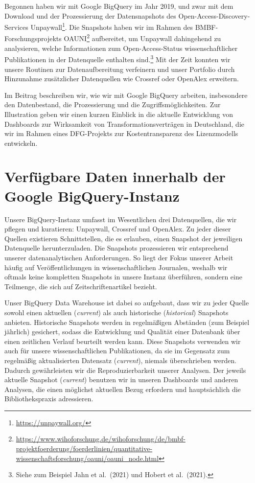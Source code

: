 \documentclass[a4paper,
fontsize=11pt,
oneside,
numbers=noperiodatend,
parskip=half-,
bibliography=totoc,
final
]{scrartcl}
\begin{document}
Begonnen haben wir mit Google BigQuery im Jahr 2019, und zwar mit dem
Download und der Prozessierung der Datensnapshots des
Open-Access-Discovery-Services Unpaywall\footnote{\url{https://unpaywall.org/}}.
Die Snapshots haben wir im Rahmen des BMBF-Forschungsprojekts
OAUNI\footnote{\url{https://www.wihoforschung.de/wihoforschung/de/bmbf-projektfoerderung/foerderlinien/quantitative-wissenschaftsforschung/oauni/oauni_node.html}}
aufbereitet, um Unpaywall dahingehend zu analysieren, welche
Informationen zum Open-Access-Status wissenschaftlicher Publikationen in
der Datenquelle enthalten sind.\footnote{Siehe zum Beispiel Jahn et
  al.~(2021) und Hobert et al.~(2021).} Mit der Zeit konnten wir unsere
Routinen zur Datenaufbereitung verfeinern und unser Portfolio durch
Hinzunahme zusätzlicher Datenquellen wie Crossref oder OpenAlex
erweitern.

Im Beitrag beschreiben wir, wie wir mit Google BigQuery arbeiten,
insbesondere den Datenbestand, die Prozessierung und die
Zugriffsmöglichkeiten. Zur Illustration geben wir einen kurzen Einblick
in die aktuelle Entwicklung von Dashboards zur Wirksamkeit von
Transformationsverträgen in Deutschland, die wir im Rahmen eines
DFG-Projekts zur Kostentransparenz des Lizenzmodells entwickeln.

\hypertarget{verfuxfcgbare-daten-innerhalb-der-google-bigquery-instanz}{%
\section{Verfügbare Daten innerhalb der Google
BigQuery-Instanz}\label{verfuxfcgbare-daten-innerhalb-der-google-bigquery-instanz}}

Unsere BigQuery-Instanz umfasst im Wesentlichen drei Datenquellen, die
wir pflegen und kuratieren: Unpaywall, Crossref und OpenAlex. Zu jeder
dieser Quellen existieren Schnittstellen, die es erlauben, einen
Snapshot der jeweiligen Datenquelle herunterzuladen. Die Snapshots
prozessieren wir entsprechend unserer datenanalytischen Anforderungen.
So liegt der Fokus unserer Arbeit häufig auf Veröffentlichungen in
wissenschaftlichen Journalen, weshalb wir oftmals keine kompletten
Snapshots in unsere Instanz überführen, sondern eine Teilmenge, die sich
auf Zeitschriftenartikel bezieht.

Unser BigQuery Data Warehouse ist dabei so aufgebaut, dass wir zu jeder
Quelle sowohl einen aktuellen (\emph{current}) als auch historische
(\emph{historical}) Snapshots anbieten. Historische Snapshots werden in
regelmäßigen Abständen (zum Beispiel jährlich) gesichert, sodass die
Entwicklung und Qualität einer Datenbank über einen zeitlichen Verlauf
beurteilt werden kann. Diese Snapshots verwenden wir auch für unsere
wissenschaftlichen Publikationen, da sie im Gegensatz zum regelmäßig
aktualisierten Datensatz (\emph{current}), niemals überschrieben werden.
Dadurch gewährleisten wir die Reproduzierbarkeit unserer Analysen. Der
jeweils aktuelle Snapshot (\emph{current}) benutzen wir in unseren
Dashboards und anderen Analysen, die einen möglichst aktuellen Bezug
erfordern und hauptsächlich die Bibliothekspraxis adressieren.
\end{document}

